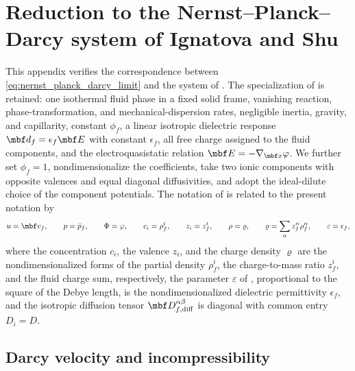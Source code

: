 \section{Reduction to the Nernst--Planck--Darcy system of Ignatova and Shu}
\label{app:nernst_planck_darcy_audit}

This appendix verifies the correspondence between
\eqref{eq:nernst_planck_darcy_limit} and the system of
\cite[eqs.~(1.1)--(1.5)]{ignatova2021charged_fluids}.  The specialization of
 is retained: one isothermal fluid phase in a
fixed solid frame, vanishing reaction, phase-transformation, and
mechanical-dispersion rates, negligible inertia, gravity, and capillarity,
constant \(\phi_f\), a linear isotropic dielectric response
\(\mbf d_f=\epsilon_f\mbf E\) with constant \(\epsilon_f\), all free charge
assigned to the fluid components, and the electroquasistatic relation
\(\mbf E=-\nabla_{\mbf x}\varphi\).  We further set \(\phi_f=1\),
nondimensionalize the coefficients, take two ionic components with opposite
valences and equal diagonal diffusivities, and adopt the ideal-dilute choice
of the component potentials.  The notation of
\cite{ignatova2021charged_fluids} is related to the present notation by
%
\begin{equation}
	u=\mbf v_f,
	\qquad
	p=\bar p_f,
	\qquad
	\Phi=\varphi,
	\qquad
	c_i=\rho_f^i,
	\qquad
	z_i=z_f^i,
	\qquad
	\rho=\varrho,
	\qquad
	\varrho=\sum_\alpha z_f^\alpha\rho_f^\alpha,
	\qquad
	\varepsilon=\epsilon_f,
	\label{eq:nernst_planck_darcy_notation_identification}
\end{equation}
%
where the concentration \(c_i\), the valence \(z_i\), and the charge density
\(\varrho\) are the nondimensionalized forms of the partial density
\(\rho_f^i\), the charge-to-mass ratio \(z_f^i\), and the fluid charge sum,
respectively, the parameter \(\varepsilon\) of
\cite{ignatova2021charged_fluids}, proportional to the square of the Debye
length, is the nondimensionalized dielectric permittivity \(\epsilon_f\),
and the isotropic diffusion tensor \(\mbf D_{f,{\rm diff}}^{\alpha\beta}\)
is diagonal with common entry \(D_i=D\).

\subsection{Darcy velocity and incompressibility}

